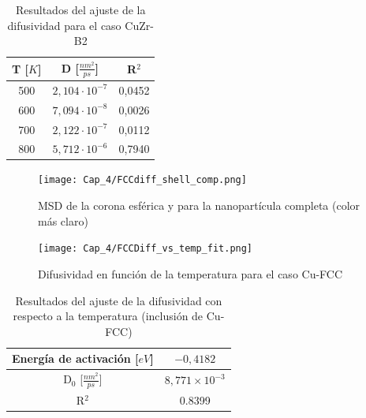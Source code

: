 \begin{table}[htp]
\begin{center}
\begin{tabular}{*{3}{c}}
\hline
T [$K$] & D [$\frac{nm^{2}}{ps}$] & R$^{2}$ \\
\hline \hline
500 & $2,104\cdot 10^{-7}$ & 0,0452 \\
\hline
600 & $7,094\cdot 10^{-8}$ & 0,0026 \\
\hline
700 & $2,122\cdot 10^{-7}$ & 0,0112 \\
\hline
800 & $5,712\cdot 10^{-6}$ & 0,7940 \\
\hline
\end{tabular}
\end{center}
\caption{Resultados del ajuste de la difusividad para el caso CuZr-B2}
\label{C4:tb:B2_Diff_Fit_Restults}
\end{table}

\begin{figure}[htp]
\centering
\texttt{[image: Cap\_4/FCCdiff\_shell\_comp.png]}
\caption[MSD de la corona esférica y la nanopartícula completa]{MSD de la corona esférica y para la nanopartícula completa (color más claro)}
\label{C4:fg:FCCdiff_shell_comp}
\end{figure}

\begin{figure}[htp]
\centering
\texttt{[image: Cap\_4/FCCDiff\_vs\_temp\_fit.png]}
\caption[Difusividad en función de la temperatura (Cu-FCC)]{Difusividad en función de la temperatura para el caso Cu-FCC}
\label{C4:fg:FCC_diff_vs_T}
\end{figure}

\begin{table}[htp]
\begin{center}
\begin{tabular}{*{2}{c}}
\hline
Energía de activación [$eV$]& $-0,4182$ \\
\hline \hline
D$_{0}$ [$\frac{nm^{2}}{ps}$] & $8,771\times 10^{-3}$\\
\hline
R$^{2}$ & 0.8399 \\
\hline
\end{tabular}
\end{center}
\caption{Resultados del ajuste de la difusividad con respecto a la temperatura (inclusión de Cu-FCC)}
\label{C4:tb:FCC_Diff_VS_T_Fit_Restults}
\end{table}

\FloatBarrier
